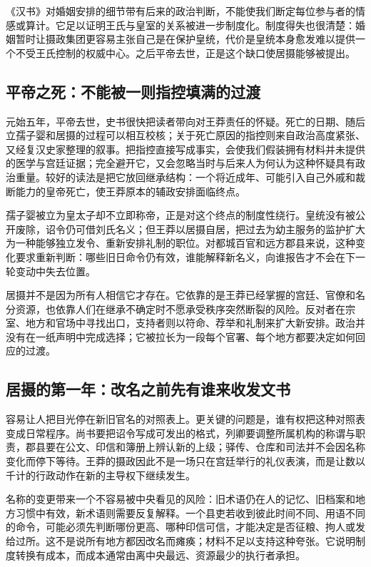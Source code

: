 《汉书》对婚姻安排的细节带有后来的政治判断，不能使我们断定每位参与者的情感或算计。它足以证明王氏与皇室的关系被进一步制度化。制度得失也很清楚：婚姻暂时让摄政集团更容易主张自己是在保护皇统，代价是皇统本身愈发难以提供一个不受王氏控制的权威中心。之后平帝去世，正是这个缺口使居摄能够被提出。

\subsection{平帝之死：不能被一则指控填满的过渡}

元始五年，平帝去世，史书很快把读者带向对王莽责任的怀疑。死亡的日期、随后立孺子婴和居摄的过程可以相互校核；关于死亡原因的指控则来自政治高度紧张、又经复汉史家整理的叙事。把指控直接写成事实，会使我们假装拥有材料并未提供的医学与宫廷证据；完全避开它，又会忽略当时与后来人为何认为这种怀疑具有政治重量。较好的读法是把它放回继承结构：一个将近成年、可能引入自己外戚和裁断能力的皇帝死亡，使王莽原本的辅政安排面临终点。

孺子婴被立为皇太子却不立即称帝，正是对这个终点的制度性绕行。皇统没有被公开废除，诏令仍可借刘氏名义；但王莽以居摄自居，把过去为幼主服务的监护扩大为一种能够独立发令、重新安排礼制的职位。对都城百官和远方郡县来说，这种变化要求重新判断：哪些旧日命令仍有效，谁能解释新名义，向谁报告才不会在下一轮变动中失去位置。

居摄并不是因为所有人相信它才存在。它依靠的是王莽已经掌握的宫廷、官僚和名分资源，也依靠人们在继承不确定时不愿承受秩序突然断裂的风险。反对者在宗室、地方和官场中寻找出口，支持者则以符命、荐举和礼制来扩大新安排。政治并没有在一纸声明中完成选择；它被拉长为一段每个官署、每个地方都要决定如何回应的过渡。

\subsection{居摄的第一年：改名之前先有谁来收发文书}

容易让人把目光停在新旧官名的对照表上。更关键的问题是，谁有权把这种对照表变成日常程序。尚书要把诏令写成可发出的格式，列卿要调整所属机构的称谓与职责，郡县要在公文、印信和簿册上辨认新的上级；驿传、仓库和司法并不会因名称变化而停下等待。王莽的摄政因此不是一场只在宫廷举行的礼仪表演，而是让数以千计的行政动作在新的主导权下继续发生。

名称的变更带来一个不容易被中央看见的风险：旧术语仍在人的记忆、旧档案和地方习惯中有效，新术语则需要反复解释。一个县吏若收到彼此时间不同、用语不同的命令，可能必须先判断哪份更高、哪种印信可信，才能决定是否征粮、拘人或发给过所。这不是说所有地方都因改名而瘫痪；材料不足以支持这种夸张。它说明制度转换有成本，而成本通常由离中央最远、资源最少的执行者承担。

